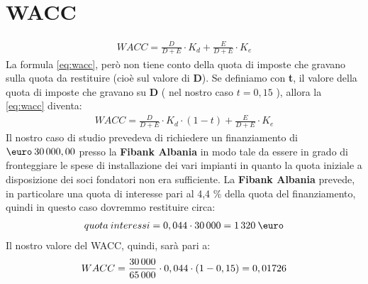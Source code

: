 \section[WACC]{WACC}
	\begin{equation}
	\label{eq:wacc}
	\begin{split}
		WACC = \frac{D}{D+E} \cdot K_d + \frac{E}{D+E} \cdot K_e 
	\end{split}
	\end{equation}
	La formula \ref{eq:wacc}, però non tiene conto della quota di imposte che gravano sulla quota da restituire (cioè sul valore di \textbf{D}). \newline Se definiamo con \textbf{t}, il valore della quota di imposte che gravano su \textbf{D} ( nel nostro caso $ t = 0,15 $ ), allora la \ref{eq:wacc} diventa:
	\begin{equation}
	\label{eq:wacc_tax}
	\begin{split}
		WACC = \frac{D}{D+E} \cdot K_d \cdot ( 1 - t ) + \frac{E}{D+E} \cdot K_e 
	\end{split}
	\end{equation}	
	Il nostro caso di studio prevedeva di richiedere un finanziamento di $\mbox{\euro} \: 30\thinspace 000,00$ presso la \textbf{\ac{Fibank Albania}} in modo tale da essere in grado di fronteggiare le spese di installazione dei vari impianti in quanto la quota iniziale a disposizione dei soci fondatori non era sufficiente.
\newline
La \textbf{\ac{Fibank Albania}} prevede, in particolare una quota di interesse pari al 4,4 \% della quota del finanziamento, quindi in questo caso dovremmo restituire circa:
	\begin{equation}
	\label{eq:interessi_fibank}
	\begin{split}
		quota \: interessi = 0,044 \cdot 30\thinspace 000 = 1\thinspace 320 \:\mbox{\euro} 
	\end{split}
	\end{equation}	
Il nostro valore del \ac{WACC}, quindi, sarà pari a:
	\begin{equation}
	\label{eq:wacc_tax_value}
	\begin{split}
		WACC = \frac{30\thinspace 000}{65\thinspace 000} \cdot 0,044 \cdot ( 1 - 0,15 ) = 0,01726 
	\end{split}
	\end{equation}